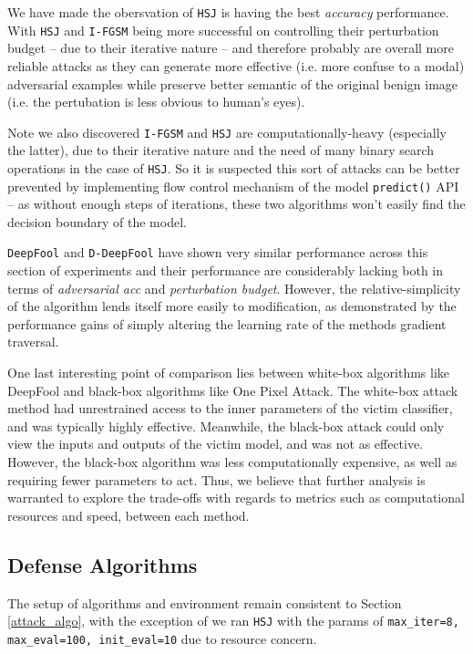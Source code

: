 \documentclass[11pt]{article}
\newcommand{\ilc}{\texttt}
\begin{document}
	We have made the obersvation of \ilc{HSJ} is having the best \textit{accuracy} performance. With \ilc{HSJ} and \ilc{I-FGSM} being more successful on controlling their perturbation budget -- due to their iterative nature -- and therefore probably are overall more reliable attacks as they can generate more effective (i.e. more confuse to a modal) adversarial examples while preserve better semantic of the original benign image (i.e. the pertubation is less obvious to human's eyes).
	
	Note we also discovered \ilc{I-FGSM} and \ilc{HSJ} are computationally-heavy (especially the latter), due to their iterative nature and the need of many binary search operations in the case of \ilc{HSJ}. So it is suspected this sort of attacks can be better prevented by implementing flow control mechanism of the model \ilc{predict()} API -- as without enough steps of iterations, these two algorithms won't easily find the decision boundary of the model.\newline
	
	\ilc{DeepFool} and \ilc{D-DeepFool} have shown very similar performance across this section of experiments and their performance are considerably lacking both in terms of \textit{adversarial acc} and \textit{perturbation budget}. However, the relative-simplicity of the algorithm lends itself more easily to modification, as demonstrated by the performance gains of simply altering the learning rate of the methods gradient traversal.
	
	One last interesting point of comparison lies between white-box algorithms like DeepFool and black-box algorithms like One Pixel Attack. The white-box attack method had unrestrained access to the inner parameters of the victim classifier, and was typically highly effective. Meanwhile, the black-box attack could only view the inputs and outputs of the victim model, and was not as effective. However, the black-box algorithm was less computationally expensive, as well as requiring fewer parameters to act. Thus, we believe that further analysis is warranted to explore the trade-offs with regards to metrics such as computational resources and speed, between each method.
	
	\subsection{Defense Algorithms}
	
	The setup of algorithms and environment remain consistent to Section \ref{attack_algo}, with the exception of we ran \ilc{HSJ} with the params of \ilc{max\_iter=8, max\_eval=100, init\_eval=10} due to resource concern.\newline
	
\end{document}
